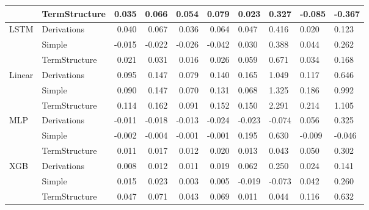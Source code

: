 \documentclass[10pt,letterpaper]{article}
\begin{document}
\begin{table}[!ht]
\begin{adjustwidth}{-2.25in}{0in}
\begin{tabular}{llrrrrp{1.5cm}p{1.5cm}p{1.5cm}p{1.5cm}}
    & TermStructure &  0.035 &  0.066 &    0.054 &      0.079 &                    0.023 &                    0.327 &                        -0.085 &                        -0.367 \\
\midrule
LSTM & Derivations &  0.040 &  0.067 &    0.036 &      0.064 &                    0.047 &                    0.416 &                         0.020 &                         0.123 \\
    & Simple & -0.015 & -0.022 &   -0.026 &     -0.042 &                    0.030 &                    0.388 &                         0.044 &                         0.262 \\
    & TermStructure &  0.021 &  0.031 &    0.016 &      0.026 &                    0.059 &                    0.671 &                         0.034 &                         0.168 \\
\midrule
Linear & Derivations &  0.095 &  0.147 &    0.079 &      0.140 &                    0.165 &                    1.049 &                         0.117 &                         0.646 \\
    & Simple &  0.090 &  0.147 &    0.070 &      0.131 &                    0.068 &                    1.325 &                         0.186 &                         0.992 \\
    & TermStructure &  0.114 &  0.162 &    0.091 &      0.152 &                    0.150 &                    2.291 &                         0.214 &                         1.105 \\
\midrule
MLP & Derivations & -0.011 & -0.018 &   -0.013 &     -0.024 &                   -0.023 &                   -0.074 &                         0.056 &                         0.325 \\
    & Simple & -0.002 & -0.004 &   -0.001 &     -0.001 &                    0.195 &                    0.630 &                        -0.009 &                        -0.046 \\
    & TermStructure &  0.011 &  0.017 &    0.012 &      0.020 &                    0.013 &                    0.043 &                         0.050 &                         0.302 \\
\midrule
XGB & Derivations &  0.008 &  0.012 &    0.011 &      0.019 &                    0.062 &                    0.250 &                         0.024 &                         0.141 \\
    & Simple &  0.015 &  0.023 &    0.003 &      0.005 &                   -0.019 &                   -0.073 &                         0.042 &                         0.260 \\
    & TermStructure &  0.047 &  0.071 &    0.043 &      0.069 &                    0.011 &                    0.044 &                         0.116 &                         0.632 \\
\bottomrule
\end{tabular}




\end{adjustwidth}
\end{table}
\end{document}
